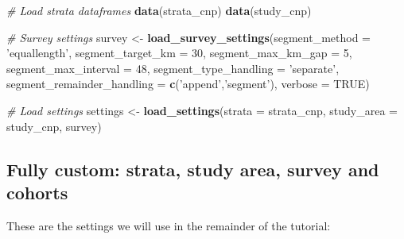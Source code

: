 \documentclass[
]{book}
\newenvironment{Shaded}{\begin{snugshade}}{\end{snugshade}}
\newcommand{\CommentTok}[1]{\textcolor[rgb]{0.56,0.35,0.01}{\textit{#1}}}
\newcommand{\DataTypeTok}[1]{\textcolor[rgb]{0.13,0.29,0.53}{#1}}
\newcommand{\DecValTok}[1]{\textcolor[rgb]{0.00,0.00,0.81}{#1}}
\newcommand{\KeywordTok}[1]{\textcolor[rgb]{0.13,0.29,0.53}{\textbf{#1}}}
\newcommand{\NormalTok}[1]{#1}
\newcommand{\OtherTok}[1]{\textcolor[rgb]{0.56,0.35,0.01}{#1}}
\newcommand{\StringTok}[1]{\textcolor[rgb]{0.31,0.60,0.02}{#1}}
\begin{document}
\begin{Shaded}
\begin{Highlighting}[]
\CommentTok{# Load strata dataframes}
\KeywordTok{data}\NormalTok{(strata_cnp)}
\KeywordTok{data}\NormalTok{(study_cnp)}

\CommentTok{# Survey settings}
\NormalTok{survey <-}\StringTok{ }
\StringTok{  }\KeywordTok{load_survey_settings}\NormalTok{(}\DataTypeTok{segment_method =} \StringTok{'equallength'}\NormalTok{,}
                       \DataTypeTok{segment_target_km =} \DecValTok{30}\NormalTok{,}
                       \DataTypeTok{segment_max_km_gap =} \DecValTok{5}\NormalTok{,}
                       \DataTypeTok{segment_max_interval =} \DecValTok{48}\NormalTok{,}
                       \DataTypeTok{segment_type_handling =} \StringTok{'separate'}\NormalTok{,}
                       \DataTypeTok{segment_remainder_handling =} \KeywordTok{c}\NormalTok{(}\StringTok{'append'}\NormalTok{,}\StringTok{'segment'}\NormalTok{),}
                       \DataTypeTok{verbose =} \OtherTok{TRUE}\NormalTok{)}

\CommentTok{# Load settings}
\NormalTok{settings <-}\StringTok{ }\KeywordTok{load_settings}\NormalTok{(}\DataTypeTok{strata =}\NormalTok{ strata_cnp,}
                          \DataTypeTok{study_area =}\NormalTok{ study_cnp,}
\NormalTok{                          survey)}
\end{Highlighting}
\end{Shaded}

\hypertarget{fully-custom-strata-study-area-survey-and-cohorts}{%
\subsection*{Fully custom: strata, study area, survey and cohorts}\label{fully-custom-strata-study-area-survey-and-cohorts}}

These are the settings we will use in the remainder of the tutorial:
\end{document}
